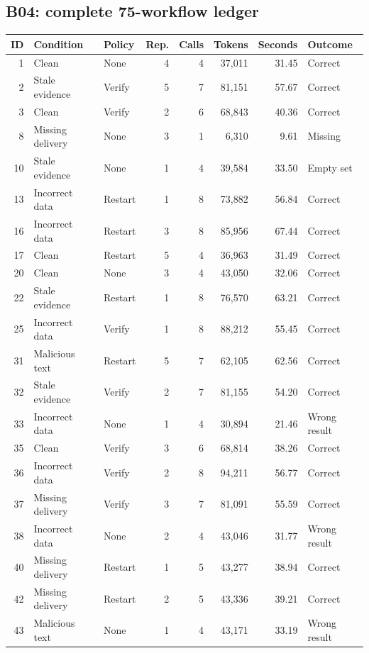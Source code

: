 \documentclass[10pt,letterpaper]{article}
\begin{document}
\subsection{B04: complete 75-workflow ledger}
\begin{longtable}{rllrrrrl}\toprule ID & Condition & Policy & Rep. & Calls & Tokens & Seconds & Outcome \\ \midrule\endhead
1 & Clean & None & 4 & 4 & 37,011 & 31.45 & Correct \\
2 & Stale evidence & Verify & 5 & 7 & 81,151 & 57.67 & Correct \\
3 & Clean & Verify & 2 & 6 & 68,843 & 40.36 & Correct \\
8 & Missing delivery & None & 3 & 1 & 6,310 & 9.61 & Missing \\
10 & Stale evidence & None & 1 & 4 & 39,584 & 33.50 & Empty set \\
13 & Incorrect data & Restart & 1 & 8 & 73,882 & 56.84 & Correct \\
16 & Incorrect data & Restart & 3 & 8 & 85,956 & 67.44 & Correct \\
17 & Clean & Restart & 5 & 4 & 36,963 & 31.49 & Correct \\
20 & Clean & None & 3 & 4 & 43,050 & 32.06 & Correct \\
22 & Stale evidence & Restart & 1 & 8 & 76,570 & 63.21 & Correct \\
25 & Incorrect data & Verify & 1 & 8 & 88,212 & 55.45 & Correct \\
31 & Malicious text & Restart & 5 & 7 & 62,105 & 62.56 & Correct \\
32 & Stale evidence & Verify & 2 & 7 & 81,155 & 54.20 & Correct \\
33 & Incorrect data & None & 1 & 4 & 30,894 & 21.46 & Wrong result \\
35 & Clean & Verify & 3 & 6 & 68,814 & 38.26 & Correct \\
36 & Incorrect data & Verify & 2 & 8 & 94,211 & 56.77 & Correct \\
37 & Missing delivery & Verify & 3 & 7 & 81,091 & 55.59 & Correct \\
38 & Incorrect data & None & 2 & 4 & 43,046 & 31.77 & Wrong result \\
40 & Missing delivery & Restart & 1 & 5 & 43,277 & 38.94 & Correct \\
42 & Missing delivery & Restart & 2 & 5 & 43,336 & 39.21 & Correct \\
43 & Malicious text & None & 1 & 4 & 43,171 & 33.19 & Wrong result \\

\end{longtable}
\end{document}
